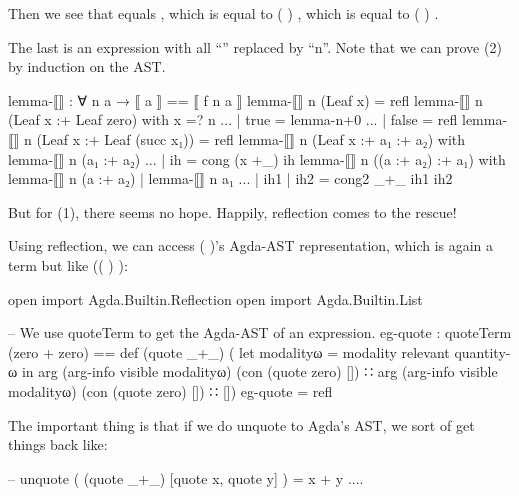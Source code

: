 \documentclass{article}
\begin{document}
Then we see that  equals  , which is equal to \AgdaSymbol(  \AgdaFunction{[\AgdaUnderscore{}]}\AgdaSymbol) , which is equal to \AgdaSymbol(    \AgdaFunction{[\AgdaUnderscore{}]}\AgdaSymbol) .

The last is an expression with all ``'' replaced by ``n''. Note that we can prove (2) by induction on the AST.

\begin{code}
lemma-⟦⟧ : ∀ n a →  ⟦ a ⟧ == ⟦ f n a ⟧
lemma-⟦⟧ n (Leaf x) = refl
lemma-⟦⟧ n (Leaf x :+ Leaf zero) with x =? n
... | true = lemma-n+0
... | false = refl
lemma-⟦⟧ n (Leaf x :+ Leaf (succ x₁)) = refl
lemma-⟦⟧ n (Leaf x :+ a₁ :+ a₂) with lemma-⟦⟧ n (a₁ :+ a₂)
... | ih = cong (x +_) ih
lemma-⟦⟧ n ((a :+ a₂) :+ a₁) with lemma-⟦⟧ n (a :+ a₂) | lemma-⟦⟧ n a₁
... | ih1 | ih2 = cong2 _+_ ih1 ih2
\end{code}

But for (1), there seems no hope. Happily, reflection comes to the rescue!

Using reflection, we can access \AgdaSymbol( \AgdaOperator{\AgdaFunction{+}} \AgdaSymbol)'s Agda-AST representation, which is again a term but like \AgdaSymbol(\AgdaSymbol( \AgdaFunction{\AgdaUnderscore{}+\AgdaUnderscore{}}\AgdaSymbol) \AgdaOperator{\AgdaFunction{[}}   \AgdaOperator{\AgdaInductiveConstructor{,}}   \AgdaOperator{\AgdaFunction{]}}\AgdaSymbol):

\begin{code}
open import Agda.Builtin.Reflection
open import Agda.Builtin.List

-- We use quoteTerm to get the Agda-AST of an expression.
eg-quote : quoteTerm (zero + zero) ==
  def (quote _+_)
      ( let modalityω = modality relevant quantity-ω in
        arg (arg-info visible modalityω) (con (quote zero) [])
      ∷ arg (arg-info visible modalityω) (con (quote zero) [])
      ∷ [])
eg-quote = refl
\end{code}

The important thing is that if we do unquote to Agda's AST, we sort of get things back like:

\begin{code}
-- unquote ( (quote _+_) [quote x, quote y] ) = x + y ....
\end{code}
\end{document}
